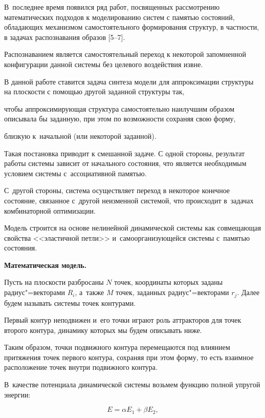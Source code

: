 В~последнее время появился ряд работ, посвященных рассмотрению математических подходов к моделированию систем с памятью состояний, обладающих механизмом самостоятельного формирования структур, в частности, в задачах распознавания  образов [5--7].

Распознаванием является самостоятельный переход к некоторой запомненной конфигурации данной системы без целевого воздействия извне.



В данной работе ставится задача синтеза модели для аппроксимации структуры на плоскости с помощью другой заданной структуры так,

чтобы аппроксимирующая структура самостоятельно наилучшим образом описывала бы заданную, при этом по возможности сохраняя свою форму,

близкую к~начальной (или некоторой заданной).

Такая постановка приводит к смешанной задаче. С одной стороны, результат работы системы зависит от начального состояния, что является необходимым условием системы с~ассоциативной памятью.

С~другой стороны, система осуществляет переход в некоторое конечное состояние, связанное с~другой неизменной системой, что происходит в~задачах комбинаторной оптимизации.

Модель строится на основе нелинейной динамической системы как совмещающая свойства <<эластичной петли>> и~самоорганизующейся системы с~памятью состояния.







\textbf{Математическая модель.}

Пусть на плоскости разбросаны $N$ точек, координаты которых заданы радиус"=векторами $R_{i}$, а~также $M$ точек, заданных радиус"=векторами $r_{j}$. Далее будем называть системы точек контурами.

Первый контур неподвижен и~его точки играют роль аттракторов для точек второго контура, динамику которых мы будем описывать ниже.

Таким образом, точки подвижного контура перемещаются под влиянием притяжения точек первого контура, сохраняя при этом форму, то есть взаимное расположение точек внутри подвижного контура.

В~качестве потенциала динамической системы возьмем функцию полной упругой энергии:

\begin{equation} \label{GrindEQ__1_}

E=\alpha E_{1} +\beta E_{2} ,

\end{equation}

